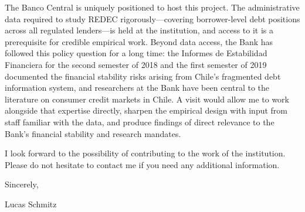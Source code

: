 \documentclass[12pt]{article}
\begin{document}
The Banco Central is uniquely positioned to host this project. The administrative data required to study REDEC rigorously---covering borrower-level debt positions across all regulated lenders---is held at the institution, and access to it is a prerequisite for credible empirical work. Beyond data access, the Bank has followed this policy question for a long time: the Informes de Estabilidad Financiera for the second semester of 2018 and the first semester of 2019 documented the financial stability risks arising from Chile's fragmented debt information system, and researchers at the Bank have been central to the literature on consumer credit markets in Chile. A visit would allow me to work alongside that expertise directly, sharpen the empirical design with input from staff familiar with the data, and produce findings of direct relevance to the Bank's financial stability and research mandates.

\bigskip

\noindent I look forward to the possibility of contributing to the work of the institution. Please do not hesitate to contact me if you need any additional information.

\bigskip

\noindent Sincerely,

\bigskip
\bigskip

\noindent Lucas Schmitz
\end{document}
